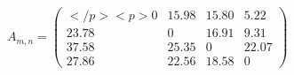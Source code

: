 \documentclass[12pt]{article}
\begin{document}
$ \begin{equation*}    A_{m,n} =     \begin{pmatrix}</p>
<p>0 &15.98 & 15.80& 5.22\\ 23.78 & 0 &16.91 & 9.31 \\ 37.58 & 25.35 & 0 & 22.07 \\ 27.86 & 22.56 & 18.58 & 0    \end{pmatrix}\end{equation*} $
\end{document}
